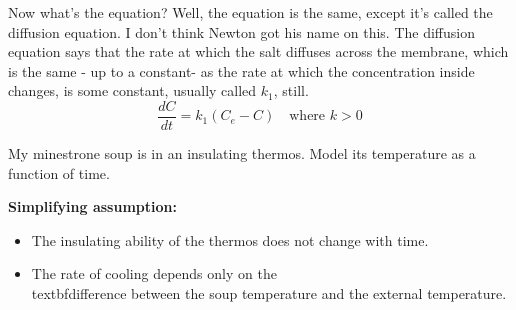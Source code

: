 Now what's the equation?
Well, the equation is the same, except it's called the diffusion equation.
I don't think Newton got his name on this.
The diffusion equation says that the rate at which the salt diffuses across the membrane, which
is the same - up to a constant- as the rate at which the concentration inside changes, is some constant,
usually called $k_1$, still.
\begin{equation*}
  \frac{dC}{dt} = k_1 (C_e - C) \quad \text{where } k > 0 
\end{equation*}

\begin{example}
  My minestrone soup is in an insulating thermos. Model its temperature as a function of time.
\end{example}

\textbf{Simplifying assumption: }
\begin{itemize}
\item The insulating ability of the thermos does not change with time.
\item The rate of cooling depends only on the \\textbf{difference} between the soup temperature and the external temperature.
\end{itemize}

